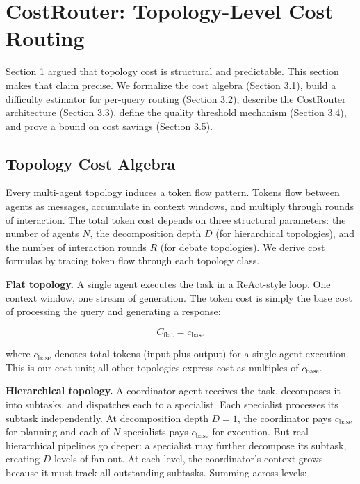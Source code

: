 \section{CostRouter: Topology-Level Cost Routing}\label{costrouter-topology-level-cost-routing}

Section 1 argued that topology cost is structural and predictable. This section makes that claim precise. We formalize the cost algebra (Section 3.1), build a difficulty estimator for per-query routing (Section 3.2), describe the CostRouter architecture (Section 3.3), define the quality threshold mechanism (Section 3.4), and prove a bound on cost savings (Section 3.5).

\subsection{Topology Cost Algebra}\label{topology-cost-algebra}

Every multi-agent topology induces a token flow pattern. Tokens flow between agents as messages, accumulate in context windows, and multiply through rounds of interaction. The total token cost depends on three structural parameters: the number of agents $N$, the decomposition depth $D$ (for hierarchical topologies), and the number of interaction rounds $R$ (for debate topologies). We derive cost formulas by tracing token flow through each topology class.

\textbf{Flat topology.} A single agent executes the task in a ReAct-style loop. One context window, one stream of generation. The token cost is simply the base cost of processing the query and generating a response:

$$C_{\text{flat}} = c_{\text{base}}$$

where $c_{\text{base}}$ denotes total tokens (input plus output) for a single-agent execution. This is our cost unit; all other topologies express cost as multiples of $c_{\text{base}}$.

\textbf{Hierarchical topology.} A coordinator agent receives the task, decomposes it into subtasks, and dispatches each to a specialist. Each specialist processes its subtask independently. At decomposition depth $D = 1$, the coordinator pays $c_{\text{base}}$ for planning and each of $N$ specialists pays $c_{\text{base}}$ for execution. But real hierarchical pipelines go deeper: a specialist may further decompose its subtask, creating $D$ levels of fan-out. At each level, the coordinator's context grows because it must track all outstanding subtasks. Summing across levels:

